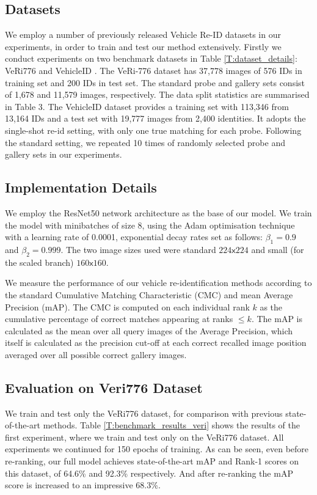 \documentclass[10pt,twocolumn,letterpaper]{article}
\def\x{{\mathsf x}}
\begin{document}
\subsection{Datasets}
We employ a number of previously released Vehicle Re-ID datasets in our experiments, in order to train and test our method extensively. Firstly we conduct experiments on two benchmark datasets in Table \ref{T:dataset_details}:
VeRi776 \cite{liu2016veri} and VehicleID \cite{liu2016vehicleid}.
%
The VeRi-776 dataset \cite{liu2016veri} has 37,778 images of 576 IDs in training set and 200
IDs in test set. The standard probe and gallery sets consist of 1,678 and 11,579
images, respectively. The data split statistics are summarised in Table 3.
%
The VehicleID \cite{liu2016vehicleid} dataset provides a training set with 113,346 from 13,164 IDs and a test set
with 19,777 images from 2,400 identities. It adopts the single-shot re-id setting,
with only one true matching for each probe. Following the standard setting, we
repeated 10 times of randomly selected probe and gallery sets in our experiments.


\subsection{Implementation Details}
We employ the ResNet50 \cite{} network architecture as the base of our model. We train the model with minibatches of size 8, using the Adam optimisation technique with a learning rate of 0.0001, exponential decay rates set as follows: $\beta_1=0.9$ and $\beta_2=0.999$. The two image sizes used were standard $224\x224$ and small (for the scaled branch) $160\x160$.

We measure the performance of our vehicle re-identification methods according to the standard Cumulative Matching Characteristic (CMC) and mean Average Precision (mAP). The CMC is computed on each individual rank $k$ as the cumulative percentage of correct matches appearing
at ranks $\leq k$. The mAP is calculated as the mean over all query images of the Average Precision, which itself is calculated as the precision cut-off at each correct recalled image position averaged over all possible correct gallery images.

\subsection{Evaluation on Veri776 Dataset}
We train and test only the VeRi776 dataset, for comparison with previous state-of-the-art methods.
Table \ref{T:benchmark_results_veri} shows the results of the first experiment, where we train and test only on the VeRi776 dataset. All experiments we continued for 150 epochs of training. As can be seen, even before re-ranking, our full model achieves state-of-the-art mAP and Rank-1 scores on this dataset, of 64.6\% and 92.3\% respectively. And after re-ranking the mAP score is increased to an impressive 68.3\%.
\end{document}
